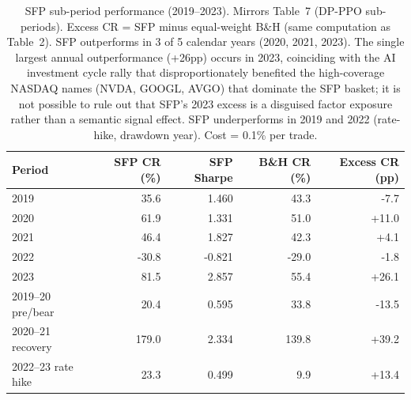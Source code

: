 \begin{table}[htbp]
\centering
\caption{SFP sub-period performance (2019--2023). Mirrors Table~7 (DP-PPO sub-periods). Excess CR = SFP minus equal-weight B\&H (same computation as Table~2). SFP outperforms in 3 of 5 calendar years (2020, 2021, 2023). The single largest annual outperformance (+26pp) occurs in 2023, coinciding with the AI investment cycle rally that disproportionately benefited the high-coverage NASDAQ names (NVDA, GOOGL, AVGO) that dominate the SFP basket; it is not possible to rule out that SFP's 2023 excess is a disguised factor exposure rather than a semantic signal effect. SFP underperforms in 2019 and 2022 (rate-hike, drawdown year). Cost = 0.1\% per trade.}
\label{tab:sfp_subperiod}
\begin{tabular}{lrrrr}
\toprule
\textbf{Period} & \textbf{SFP CR (\%)} & \textbf{SFP Sharpe} & \textbf{B\&H CR (\%)} & \textbf{Excess CR (pp)} \\
\midrule
2019 & 35.6 & 1.460 & 43.3 & -7.7 \\
2020 & 61.9 & 1.331 & 51.0 & +11.0 \\
2021 & 46.4 & 1.827 & 42.3 & +4.1 \\
2022 & -30.8 & -0.821 & -29.0 & -1.8 \\
2023 & 81.5 & 2.857 & 55.4 & +26.1 \\
2019--20 pre/bear & 20.4 & 0.595 & 33.8 & -13.5 \\
2020--21 recovery & 179.0 & 2.334 & 139.8 & +39.2 \\
2022--23 rate hike & 23.3 & 0.499 & 9.9 & +13.4 \\
\bottomrule
\end{tabular}
\end{table}
